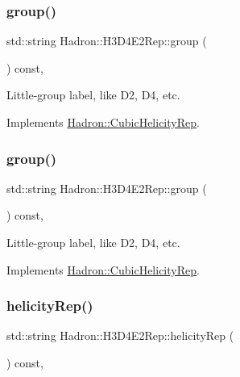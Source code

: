 \subsubsection{\texorpdfstring{group()}{group()}\hspace{0.1cm}{\footnotesize\ttfamily [2/3]}}
{\footnotesize\ttfamily std\+::string Hadron\+::\+H3\+D4\+E2\+Rep\+::group (\begin{DoxyParamCaption}{ }\end{DoxyParamCaption}) const\hspace{0.3cm}{\ttfamily [inline]}, {\ttfamily [virtual]}}

Little-\/group label, like D2, D4, etc. 

Implements \mbox{\hyperlink{structHadron_1_1CubicHelicityRep_a101a7d76cd8ccdad0f272db44b766113}{Hadron\+::\+Cubic\+Helicity\+Rep}}.

\mbox{\label{structHadron_1_1H3D4E2Rep_acfd57e0a45fce51a748dfe354f357e8a}} 
\subsubsection{\texorpdfstring{group()}{group()}\hspace{0.1cm}{\footnotesize\ttfamily [3/3]}}
{\footnotesize\ttfamily std\+::string Hadron\+::\+H3\+D4\+E2\+Rep\+::group (\begin{DoxyParamCaption}{ }\end{DoxyParamCaption}) const\hspace{0.3cm}{\ttfamily [inline]}, {\ttfamily [virtual]}}

Little-\/group label, like D2, D4, etc. 

Implements \mbox{\hyperlink{structHadron_1_1CubicHelicityRep_a101a7d76cd8ccdad0f272db44b766113}{Hadron\+::\+Cubic\+Helicity\+Rep}}.

\mbox{\label{structHadron_1_1H3D4E2Rep_a9b041630539536a249a5a6cae0fdb0d4}} 
\subsubsection{\texorpdfstring{helicityRep()}{helicityRep()}\hspace{0.1cm}{\footnotesize\ttfamily [1/2]}}
{\footnotesize\ttfamily std\+::string Hadron\+::\+H3\+D4\+E2\+Rep\+::helicity\+Rep (\begin{DoxyParamCaption}{ }\end{DoxyParamCaption}) const\hspace{0.3cm}{\ttfamily [inline]}, {\ttfamily [virtual]}}


